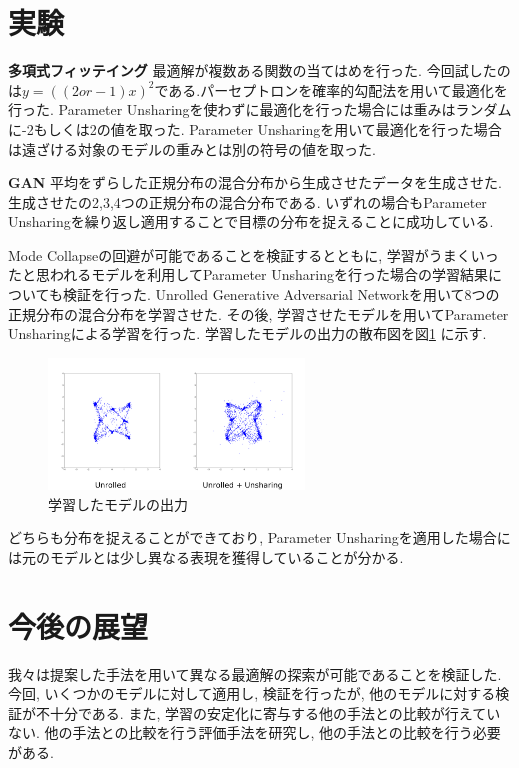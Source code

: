 \documentclass[techrep, submit, noauthor,preface]{ipsj}
\begin{document}
\section{実験}

{\bf 多項式フィッテイング} 最適解が複数ある関数の当てはめを行った. 今回試したのは$y = ((2or-1)x)^2$である.パーセプトロンを確率的勾配法を用いて最適化を行った. Parameter Unsharingを使わずに最適化を行った場合には重みはランダムに-2もしくは2の値を取った. Parameter Unsharingを用いて最適化を行った場合は遠ざける対象のモデルの重みとは別の符号の値を取った.

{\bf GAN} 平均をずらした正規分布の混合分布から生成させたデータを生成させた. 生成させたの2,3,4つの正規分布の混合分布である.
いずれの場合もParameter Unsharingを繰り返し適用することで目標の分布を捉えることに成功している.

Mode Collapseの回避が可能であることを検証するとともに, 
学習がうまくいったと思われるモデルを利用してParameter Unsharingを行った場合の学習結果についても検証を行った. 
Unrolled Generative Adversarial Networkを用いて8つの正規分布の混合分布を学習させた. その後, 
学習させたモデルを用いてParameter Unsharingによる学習を行った. 学習したモデルの出力の散布図を図\ref{fig:unrolled}
に示す.

\begin{figure}[htb]
  \vspace{-0.5cm}
  \centering
    \includegraphics[height=3.5cm]{unrolled.png}
  \caption{学習したモデルの出力}
  \label{fig:unrolled}
  \vspace{-0.5cm}
\end{figure}

どちらも分布を捉えることができており, Parameter Unsharingを適用した場合には元のモデルとは少し異なる表現を獲得していることが分かる.

\section{今後の展望}

我々は提案した手法を用いて異なる最適解の探索が可能であることを検証した. 今回, いくつかのモデルに対して適用し, 検証を行ったが, 他のモデルに対する検証が不十分である. また, 学習の安定化に寄与する他の手法との比較が行えていない. 他の手法との比較を行う評価手法を研究し, 他の手法との比較を行う必要がある.



\end{document}
